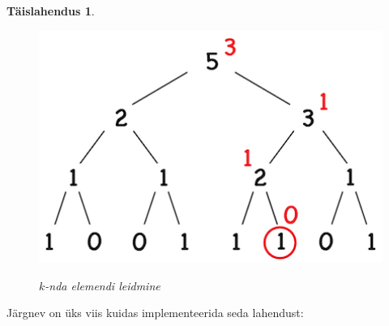 \documentclass{trkut}
\newtheorem*{solution}{Täislahendus}
\begin{document}
\begin{solution}
\begin{figure}[H]%
    \includegraphics[width=12cm]{kth.png}%
    \caption{$k$-nda elemendi leidmine}%
    \label{joonis}%
\end{figure}
\end{solution}
Järgnev on üks viis kuidas implementeerida seda lahendust:
\end{document}
